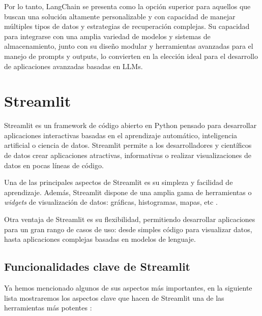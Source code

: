                 \noindent Por lo tanto, LangChain se presenta como la opción superior para aquellos que buscan una solución altamente personalizable y con capacidad de manejar múltiples tipos de datos y estrategias de recuperación complejas. Su capacidad para integrarse con una amplia variedad de modelos y sistemas de almacenamiento, junto con su diseño modular y herramientas avanzadas para el manejo de prompts y outputs, lo convierten en la elección ideal para el desarrollo de aplicaciones avanzadas basadas en LLMs.
            
    \section{Streamlit}
    \label{sec:2_streamlit}

        Streamlit \cite{0055_streamlitDOCS} es un framework de código abierto en Python pensado para desarrollar aplicaciones interactivas basadas en el aprendizaje automático, inteligencia artificial o ciencia de datos. Streamlit permite a los desarrolladores y científicos de datos crear aplicaciones atractivas, informativas o realizar visualizaciones de datos en pocas líneas de código.

        \noindent Una de las principales aspectos de Streamlit es su simpleza y facilidad de aprendizaje. Además, Streamlit dispone de una amplia gama de herramientas o \textit{widgets} de visualización de datos: gráficas, histogramas, mapas, etc \cite{0022_streamlit2}.

        \noindent Otra ventaja de Streamlit es su flexibilidad, permitiendo desarrollar aplicaciones para un gran rango de casos de uso: desde simples código para visualizar datos, hasta aplicaciones complejas basadas en modelos de lenguaje.

        \subsection{Funcionalidades clave de Streamlit}

            Ya hemos mencionado algunos de sus aspectos más importantes, en la siguiente lista mostraremos los aspectos clave que hacen de Streamlit una de las herramientas más potentes \cite{0021_streamlit1}:

